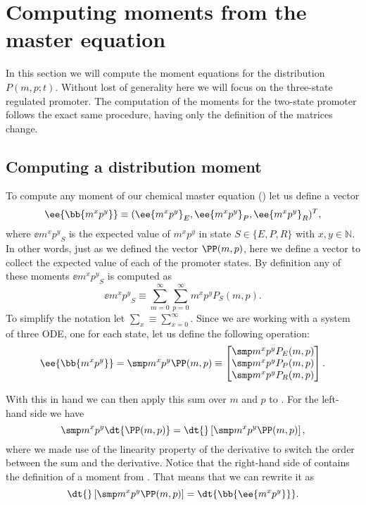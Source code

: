 \section{Computing moments from the master equation}\label{supp_moments}

In this section we will compute the moment equations for the distribution  $P(m,
p; t)$. Without lost of generality here we will focus on the three-state
regulated promoter. The computation of the moments for the two-state promoter
follows the exact same procedure, having only the definition of the matrices
change.

\subsection{Computing a distribution moment}

To compute any moment of our chemical master equation ()
let us define a vector
\begin{equation}
  \ee{\bb{m^x p^y}} \equiv (\ee{m^x p^y}_E, \ee{m^x p^y}_P, \ee{m^x p^y}_R)^T,
\end{equation}
where $\ee{m^x p^y}_S$ is the expected value of $m^x p^y$ in state $S \in \{E,
P, R\}$ with $x, y \in \mathbb{N}$. In other words, just as we defined the
vector $\PP(m, p)$, here we define a vector to collect the expected value of
each of the promoter states. By definition any of these moments $\ee{m^x p^y}_S$
is computed as
\begin{equation}
  \ee{m^x p^y}_S \equiv \sum_{m=0}^\infty \sum_{p=0}^\infty m^x p^y P_S(m, p).
  \label{seq_mom_def}
\end{equation}
To simplify the notation let $\sum_x \equiv \sum_{x=0}^\infty$. Since we are
working with a system of three ODE, one for each state, let us define the
following operation:
\begin{equation}
  \ee{\bb{m^x p^y}} =
  \smp m^x p^y \PP(m, p) \equiv
  \begin{bmatrix}
    \smp m^x p^y P_E(m, p)\\
    \smp m^x p^y P_P(m, p)\\
    \smp m^x p^y P_R(m, p)\\
  \end{bmatrix}.
\end{equation}

With this in hand we can then apply this sum over $m$ and $p$ to
. For the left-hand side we have
\begin{equation}
  \smp m^x p^y \dt{\PP(m, p)} = \dt{}\left[ \smp m^x p^y \PP(m, p) \right],
  \label{seq_sum_mom}
\end{equation}
where we made use of the linearity property of the derivative to switch the
order between the sum and the derivative. Notice that the right-hand side of
 contains the definition of a moment from .
That means that we can rewrite it as
\begin{equation}
  \dt{}\left[ \smp m^x p^y \PP(m, p) \right] = \dt{\bb{\ee{m^x p^y}}}.
\end{equation}


